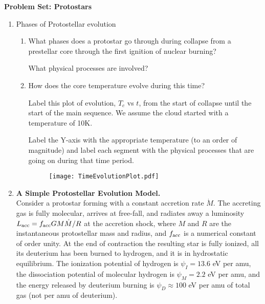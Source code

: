 \documentclass{article}
\begin{document}
\noindent\textbf{Problem Set: Protostars}


\begin{enumerate}


    \item Phases of Protostellar evolution

        \begin{enumerate}
            \item What phases does a protostar go through during collapse from a prestellar core through the first ignition of nuclear burning?

                What physical processes are involved?

            \item How does the core temperature evolve during this time?

                Label this
                plot of evolution, $T_c$ vs $t$, from the start of
                collapse until the start of the main sequence. We assume the
                cloud started with a temperature of 10K.

                Label the Y-axis with the appropriate temperature (to an order
                of magnitude) and label each segment with the physical
                processes that are going on during that time period.

                \begin{figure}[h!]
                \texttt{[image: TimeEvolutionPlot.pdf]}
                \end{figure}
                


        \end{enumerate}
\item {\bf A Simple Protostellar Evolution Model.}\\
Consider a protostar forming with a constant accretion rate $\dot{M}$. The
accreting gas is fully molecular, arrives at free-fall, and radiates away a
luminosity $L_{\rm acc} = f_{\rm acc} G M \dot{M}/R$ at the accretion shock,
where $M$ and $R$ are the instantaneous protostellar mass and radius, and
$f_{\rm acc}$ is a numerical constant of order unity. At the end of contraction
the resulting star is fully ionized, all its deuterium has been burned to
hydrogen, and it is in hydrostatic equilibrium. The ionization potential of
hydrogen is $\psi_I = 13.6$ eV per amu, the dissociation potential of molecular
hydrogen is $\psi_M=2.2$ eV per amu, and the energy released by deuterium
burning is $\psi_D\approx 100$ eV per amu of total gas (not per amu of
deuterium).


\end{enumerate}
\end{document}
